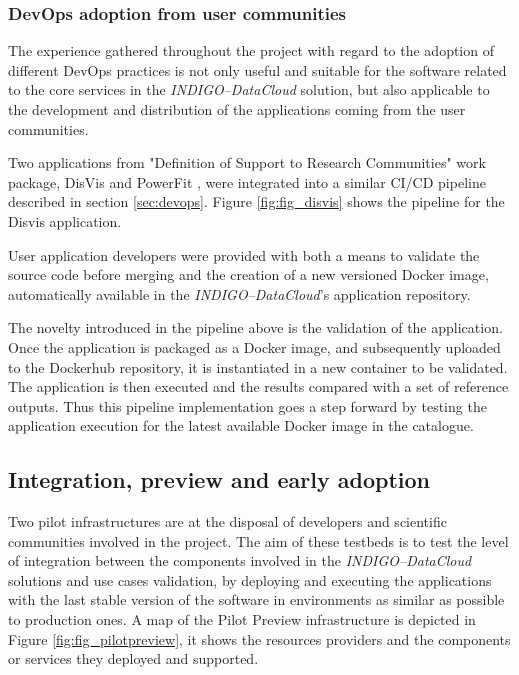\documentclass[journal]{IEEEtran}
\begin{document}
\subsubsection{DevOps adoption from user communities}

The experience gathered throughout the project with regard to the adoption of
different DevOps practices is not only useful and suitable for the software related
to the core services in the {\sl INDIGO--DataCloud} solution, but also applicable to the
development and distribution of the applications coming from the user communities.

Two applications from "Definition of Support to Research Communities" work package, 
DisVis \cite{disvis} and PowerFit \cite{powerfit}, were
integrated into a similar CI/CD pipeline described in section \ref{sec:devops}.
Figure \ref{fig:fig_disvis} shows the pipeline for the Disvis application.

User application developers were provided with both a means to validate the
source code before merging and the creation of a new versioned Docker image,
automatically available in the {\sl INDIGO--DataCloud}’s application repository.

The novelty introduced in the pipeline above is the validation of the application.
Once the application is packaged as a Docker image, and subsequently uploaded
to the Dockerhub repository, it is instantiated in a new container to be validated.
The application is then executed and the results compared with a set of reference outputs.
Thus this pipeline implementation goes a step forward by testing the application
execution for the latest available Docker image in the catalogue.


\subsection{Integration, preview and early adoption}

Two pilot infrastructures are at the disposal of developers and scientific
communities involved in the project. The aim of these testbeds is to test the
level of integration between the components involved in the {\sl INDIGO--DataCloud}
solutions and use cases validation, by deploying and executing the applications
with the last stable version of the software in environments as similar as 
possible to production ones. A map of the Pilot Preview
infrastructure is depicted in Figure \ref{fig:fig_pilotpreview}, it shows the
resources providers and the components or services they deployed and supported.
\end{document}
